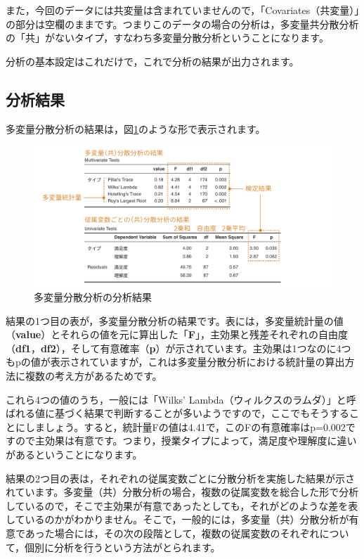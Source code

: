 \documentclass[
  12pt,
  a5jpaper,
  lualatex, ja=standard]{bxjsbook}
\begin{document}
また，今回のデータには共変量は含まれていませんので，「Covariates（共変量）」の部分は空欄のままです。つまりこのデータの場合の分析は，多変量共分散分析の「共」がないタイプ，すなわち多変量分散分析ということになります。

分析の基本設定はこれだけで，これで分析の結果が出力されます。

\hypertarget{sub:ANOVA-mancova-results}{%
\subsection{分析結果}\label{sub:ANOVA-mancova-results}}

多変量分散分析の結果は，図\ref{fig:ANOVA-mancova-results}のような形で表示されます。

\begin{figure}[!ht]

{\centering \includegraphics[width=1\linewidth]{images/ANOVA/mancova-results} 

}

\caption{多変量分散分析の分析結果}\label{fig:ANOVA-mancova-results}
\end{figure}

結果の1つ目の表が，多変量分散分析の結果です。表には，多変量統計量の値（\textbf{value}）とそれらの値を元に算出した「\textbf{F}」，主効果と残差それぞれの自由度（\textbf{df1}，\textbf{df2}），そして有意確率（\textbf{p}）が示されています。主効果は1つなのに4つもpの値が表示されていますが，これは多変量分散分析における統計量の算出方法に複数の考え方があるためです。

これら4つの値のうち，一般には「Wilks' Lambda（ウィルクスのラムダ）」と呼ばれる値に基づく結果で判断することが多いようですので，ここでもそうすることにしましょう。すると，統計量Fの値は4.41で，このFの有意確率はp=0.002ですので主効果は有意です。つまり，授業タイプによって，満足度や理解度に違いがあるということになります。

結果の2つ目の表は，それぞれの従属変数ごとに分散分析を実施した結果が示されています。多変量（共）分散分析の場合，複数の従属変数を総合した形で分析しているので，そこで主効果が有意であったとしても，それがどのような差を表しているのかがわかりません。そこで，一般的には，多変量（共）分散分析が有意であった場合には，その次の段階として，複数の従属変数のそれぞれについて，個別に分析を行うという方法がとられます。
\end{document}
